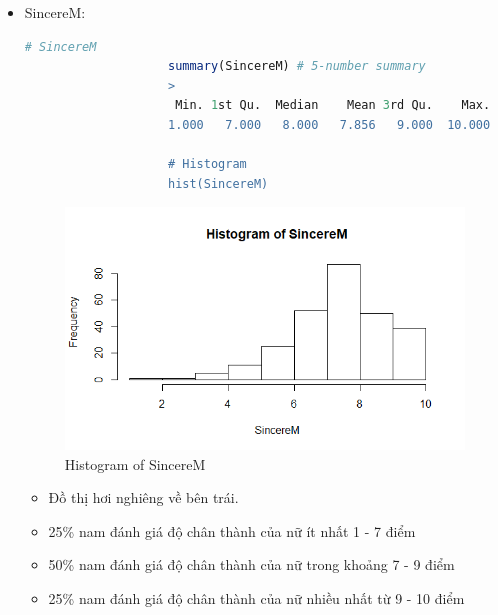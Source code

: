 \documentclass[a4paper,12pt]{article}
\begin{document}
\begin{enumerate}[label = {\alph*)}]
\begin{itemize}
					\begin{itemize}
						\item Đồ thị có dạng bell-shape
						\item 25\% mức độ thích thú của nam ít nhất 1 - 6 điểm 
						\item 50\% mức độ thích thú của nam trong khoảng 6 - 8 điểm
						\item 25\% mức độ thích thú của nam nhiều nhất từ 8 - 10 điểm
						\item Kết luận:
						\begin{itemize}
							\item 50\% mức độ thích thú của nam ít hơn 7 điểm.
							\item 50\% mức độ thích thú của nam trên 7 điểm.
						\end{itemize}
						
					\end{itemize}
					
					
					
				\item SincereM:
					\begin{lstlisting}[language = R]
					# SincereM
					summary(SincereM) # 5-number summary
					>
					 Min. 1st Qu.  Median    Mean 3rd Qu.    Max.    NA's 
					1.000   7.000   8.000   7.856   9.000  10.000       5
					
					# Histogram
					hist(SincereM)
					\end{lstlisting}
					
					\begin{figure}[H]
						\centering
						\includegraphics[width=0.7\linewidth]{Images/Rplot4}
						\caption{Histogram of SincereM}
						\label{fig:rplot4}
					\end{figure}
					
					
					\begin{itemize}
						\item Đồ thị hơi nghiêng về bên trái.
						\item 25\% nam đánh giá độ chân thành của nữ ít nhất 1 - 7 điểm
						\item 50\% nam đánh giá độ chân thành của nữ trong khoảng 7 - 9 điểm
						\item 25\% nam đánh giá độ chân thành của nữ nhiều nhất từ 9 - 10 điểm
						 

\end{itemize}
\end{itemize}
\end{enumerate}
\end{document}
